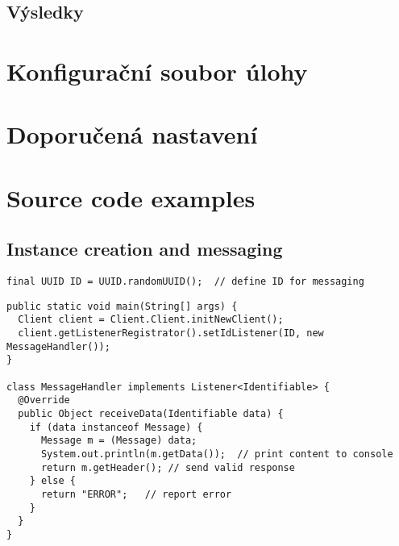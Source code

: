 \documentclass[a4paper,12pt]{article}
\begin{document}
\subsection{Výsledky}

\newpage
\section{Konfigurační soubor úlohy}

\newpage
\section{Doporučená nastavení}

\newpage
{}
\section{Source code examples}
\subsection{Instance creation and messaging}\label{appMsg}
\begin{lstlisting}[title=Constant declaration]
final UUID ID = UUID.randomUUID();	// define ID for messaging
\end{lstlisting}
\begin{lstlisting}[title=Client side code]
public static void main(String[] args) {
  Client client = Client.Client.initNewClient();
  client.getListenerRegistrator().setIdListener(ID, new MessageHandler());
}

class MessageHandler implements Listener<Identifiable> {
  @Override
  public Object receiveData(Identifiable data) {
    if (data instanceof Message) {
      Message m = (Message) data;
      System.out.println(m.getData());	// print content to console
      return m.getHeader();	// send valid response
    } else {
      return "ERROR";	// report error
    }
  }
}
\end{lstlisting}
\end{document}
